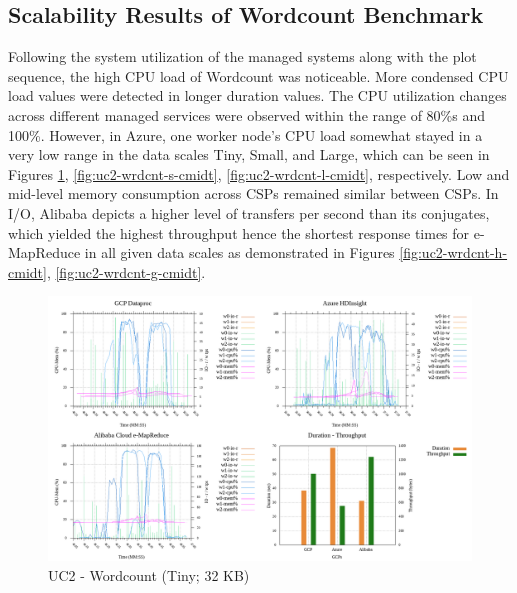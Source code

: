 \documentclass[review]{elsarticle}
\begin{document}
	\subsection{Scalability Results of Wordcount Benchmark}
	Following the system utilization of the managed systems along with the plot sequence, the high CPU load of Wordcount was noticeable. More condensed CPU load values were detected in longer duration values. The CPU utilization changes across different managed services were observed within the range of 80\%s and 100\%. However, in Azure, one worker node's CPU load somewhat stayed in a very low range in the data scales Tiny, Small, and Large, which can be seen in Figures \ref{fig:uc2-wrdcnt-t-cmidt}, \ref{fig:uc2-wrdcnt-s-cmidt}, \ref{fig:uc2-wrdcnt-l-cmidt}, respectively. 
	Low and mid-level memory consumption across CSPs remained similar between CSPs. In I/O, Alibaba depicts a higher level of transfers per second than its conjugates, which yielded the highest throughput hence the shortest response times for e-MapReduce in all given data scales as demonstrated in Figures \ref{fig:uc2-wrdcnt-h-cmidt}, \ref{fig:uc2-wrdcnt-g-cmidt}.
	
	\begin{figure}[p]
		\caption{UC2 - Wordcount (Tiny; 32 KB)}
		\label{fig:uc2-wrdcnt-t-cmidt}
		\includegraphics[width=\textwidth]{uc2-wrdcnt-t-cmidt}
		\centering
	\end{figure}
	
\end{document}
